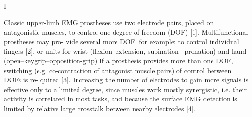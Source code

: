 I%

Classic upper-limb EMG prostheses use two electrode pairs, placed on antagonistic muscles, to control one degree of freedom (DOF) [1]. Multifunctional prostheses may pro- vide several more DOF, for example: to control individual fingers [2], or units for wrist (flexion–extension, supination– pronation) and hand (open–keygrip–opposition-grip)
If a prosthesis provides more than one DOF, switching (e.g. co-contraction of antagonist muscle pairs) of control between DOFs is re- quired [3]. Increasing the number of electrodes to gain more signals is effective only to a limited degree, since muscles work mostly synergistic, i.e. their activity is correlated in most tasks, and because the surface EMG detection is limited by relative large crosstalk between nearby electrodes [4].